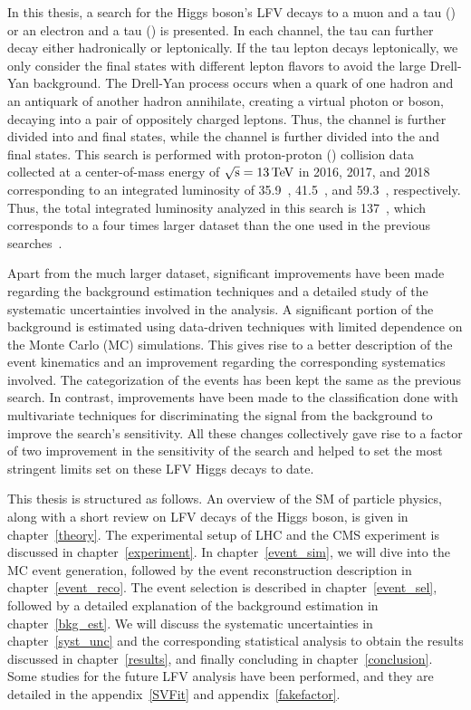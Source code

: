 In this thesis, a search for the Higgs boson's LFV decays to a muon and a tau (\mutau) or an electron and a tau (\etau) is presented. In each channel, the tau can further decay either hadronically or leptonically. If the tau lepton decays leptonically, we only consider the final states with different lepton flavors to avoid the large Drell-Yan background. The Drell-Yan process occurs when a quark of one hadron and an antiquark of another hadron annihilate, creating a virtual photon or \PZ boson, decaying into a pair of oppositely charged leptons. Thus, the \mutau channel is further divided into \muhad and \mue final states, while the \etau channel is further divided into the \ehad and \emu final states. This search is performed with proton-proton (\pp) collision data collected at a center-of-mass energy of $\sqrt{\text{s}} = 13 \,\text{Te\hspace{-.08em}V}$ in 2016, 2017, and 2018 corresponding to an integrated luminosity of 35.9~\fb, 41.5~\fb, and 59.3~\fb, respectively. Thus, the total integrated luminosity analyzed in this search is 137~\fb, which corresponds to a four times larger dataset than the one used in the previous searches~\cite{Sirunyan:2017xzt, Aad:2019ugc}.

Apart from the much larger dataset, significant improvements have been made regarding the background estimation techniques and a detailed study of the systematic uncertainties involved in the analysis. A significant portion of the background is estimated using data-driven techniques with limited dependence on the Monte Carlo (MC) simulations. This gives rise to a better description of the event kinematics and an improvement regarding the corresponding systematics involved. The categorization of the events has been kept the same as the previous search. In contrast, improvements have been made to the classification done with multivariate techniques for discriminating the signal from the background to improve the search's sensitivity. All these changes collectively gave rise to a factor of two improvement in the sensitivity of the search and helped to set the most stringent limits set on these LFV Higgs decays to date.

This thesis is structured as follows. An overview of the SM of particle physics, along with a short review on LFV decays of the Higgs boson, is given in chapter~\ref{theory}. The experimental setup of LHC and the CMS experiment is discussed in chapter~\ref{experiment}. In chapter~\ref{event_sim}, we will dive into the MC event generation, followed by the event reconstruction description in chapter~\ref{event_reco}. The event selection is described in chapter~\ref{event_sel}, followed by a detailed explanation of the background estimation in chapter~\ref{bkg_est}. We will discuss the systematic uncertainties in chapter~\ref{syst_unc} and the corresponding statistical analysis to obtain the results discussed in chapter~\ref{results}, and finally concluding in chapter~\ref{conclusion}. Some studies for the future LFV analysis have been performed, and they are detailed in the appendix~\ref{SVFit} and appendix~\ref{fakefactor}.
